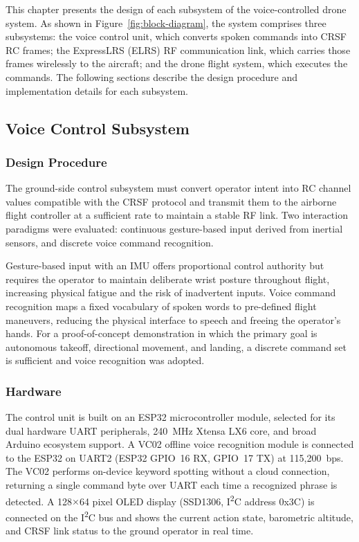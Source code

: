 This chapter presents the design of each subsystem of the voice-controlled drone system.
As shown in Figure~\ref{fig:block-diagram}, the system comprises three subsystems: the voice
control unit, which converts spoken commands into CRSF RC frames; the ExpressLRS (ELRS) RF
communication link, which carries those frames wirelessly to the aircraft; and the drone flight
system, which executes the commands.
The following sections describe the design procedure and implementation details for each subsystem.

\subsection{Voice Control Subsystem}
\label{subsec:voice}

\subsubsection{Design Procedure}

The ground-side control subsystem must convert operator intent into RC channel values
compatible with the CRSF protocol and transmit them to the airborne flight controller at a
sufficient rate to maintain a stable RF link.
Two interaction paradigms were evaluated: continuous gesture-based input derived from inertial
sensors, and discrete voice command recognition.

Gesture-based input with an IMU offers proportional control authority but requires the operator
to maintain deliberate wrist posture throughout flight, increasing physical fatigue and the risk of
inadvertent inputs.
Voice command recognition maps a fixed vocabulary of spoken words to pre-defined flight
maneuvers, reducing the physical interface to speech and freeing the operator's hands.
For a proof-of-concept demonstration in which the primary goal is autonomous takeoff,
directional movement, and landing, a discrete command set is sufficient and voice recognition
was adopted.

\subsubsection{Hardware}

The control unit is built on an ESP32 microcontroller module, selected for its dual hardware
UART peripherals, 240~MHz Xtensa LX6 core, and broad Arduino ecosystem support.
A VC02 offline voice recognition module is connected to the ESP32 on UART2 (ESP32 GPIO~16
RX, GPIO~17 TX) at 115,200~bps.
The VC02 performs on-device keyword spotting without a cloud connection, returning a single
command byte over UART each time a recognized phrase is detected.
A 128$\times$64 pixel OLED display (SSD1306, I\textsuperscript{2}C address 0x3C) is connected
on the I\textsuperscript{2}C bus and shows the current action state, barometric altitude, and CRSF
link status to the ground operator in real time.

